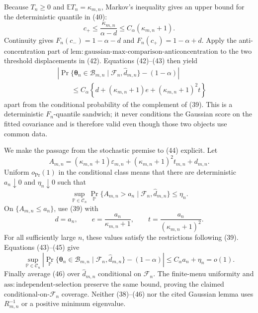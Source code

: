 Because \(T_n\ge0\) and \(\mathbb ET_n=\kappa_{m,n}\), Markov's inequality gives an upper bound for the deterministic quantile in (40):
\[
 c_+\le\frac{\kappa_{m,n}}{\alpha-d}\le C_\alpha(\kappa_{m,n}+1).
 \tag{43}
\]
Continuity gives \(F_n(c_-)=1-\alpha-d\) and \(F_n(c_+)=1-\alpha+d\).  Apply the anti-concentration part of
\(\mathrm{lem{:}gaussian\mbox{-}max\mbox{-}comparison\mbox{-}anticoncentration}\) to the two threshold displacements in (42).  Equations (42)--(43) then yield
\[
\begin{aligned}
 &\left|\Pr\{\boldsymbol\theta_n\in\mathcal B_{m,n}\mid
       \mathcal F_n,\widehat d_{m,n}\}-(1-\alpha)\right|\\
 &\qquad\le C_\alpha\left\{
 d+(\kappa_{m,n}+1)e+(\kappa_{m,n}+1)^2t\right\}
\end{aligned}
 \tag{44}
\]
apart from the conditional probability of the complement of (39).  This is a deterministic \(F_n\)-quantile sandwich; it never conditions the Gaussian score on the fitted covariance and is therefore valid even though those two objects use common data.

We make the passage from the stochastic premise to (44) explicit.  Let
\[
 A_{m,n}=(\kappa_{m,n}+1)\varepsilon_{m,n}
 +(\kappa_{m,n}+1)^2t_{m,n}+d_{m,n}.
\]
Uniform \(o_{\Pr}(1)\) in the conditional class means that there are deterministic \(a_n\downarrow0\) and \(\eta_n\downarrow0\) such that
\[
 \sup_{\mathbb P\in\mathcal C_n}
 \Pr_{\mathbb P}\{A_{m,n}>a_n\mid\mathcal F_n,\widehat d_{m,n}\}
 \le\eta_n.
 \tag{45}
\]
On \(\{A_{m,n}\le a_n\}\), use (39) with
\[
 d=a_n,\qquad e=\frac{a_n}{\kappa_{m,n}+1},\qquad
 t=\frac{a_n}{(\kappa_{m,n}+1)^2}.
\]
For all sufficiently large \(n\), these values satisfy the restrictions following (39).  Equations (43)--(45) give
\[
 \sup_{\mathbb P\in\mathcal C_n}
 \left|\Pr_{\mathbb P}\{\boldsymbol\theta_n\in\mathcal B_{m,n}\mid
       \mathcal F_n,\widehat d_{m,n}\}-(1-\alpha)\right|
 \le C_\alpha a_n+\eta_n=o(1).
 \tag{46}
\]
Finally average (46) over \(\widehat d_{m,n}\) conditional on \(\mathcal F_n\).  The finite-menu uniformity and \(\mathrm{ass{:}independent\mbox{-}selection}\) preserve the same bound, proving the claimed conditional-on-\(\mathcal F_n\) coverage.  Neither (38)--(46) nor the cited Gaussian lemma uses \(R_{m,n}^{-1}\) or a positive minimum eigenvalue.

